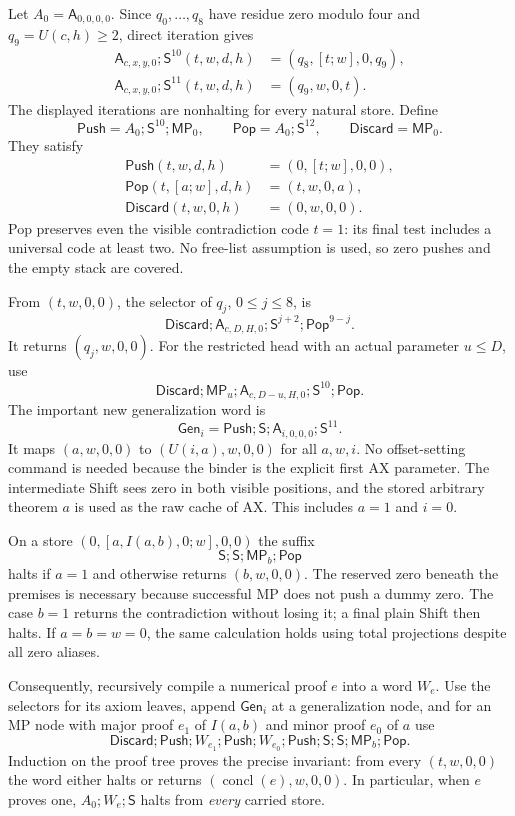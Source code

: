 Let $A_0=\mathsf A_{0,0,0,0}$. Since $q_0,\ldots,q_8$ have residue
zero modulo four and $q_9=U(c,h)\ge2$, direct iteration gives
\begin{align*}
 \mathsf A_{c,x,y,0};\mathsf S^{10}(t,w,d,h)
      &=(q_8,[t;w],0,q_9),\\
 \mathsf A_{c,x,y,0};\mathsf S^{11}(t,w,d,h)
      &=(q_9,w,0,t).
\end{align*}
The displayed iterations are nonhalting for every natural store.
Define
\[
 \mathsf{Push}=A_0;\mathsf S^{10};\mathsf{MP}_0,\qquad
 \mathsf{Pop}=A_0;\mathsf S^{12},\qquad
 \mathsf{Discard}=\mathsf{MP}_0.
\]
They satisfy
\begin{align*}
 \mathsf{Push}(t,w,d,h)&=(0,[t;w],0,0),\\
 \mathsf{Pop}(t,[a;w],d,h)&=(t,w,0,a),\\
 \mathsf{Discard}(t,w,0,h)&=(0,w,0,0).
\end{align*}
Pop preserves even the visible contradiction code $t=1$: its final
test includes a universal code at least two. No free-list assumption is
used, so zero pushes and the empty stack are covered.

From $(t,w,0,0)$, the selector of $q_j$, $0\le j\le8$, is
\[
 \mathsf{Discard};\mathsf A_{c,D,H,0};
           \mathsf S^{j+2};\mathsf{Pop}^{9-j}.
\]
It returns $(q_j,w,0,0)$. For the restricted head with an actual
parameter $u\le D$, use
\[
 \mathsf{Discard};\mathsf{MP}_u;
 \mathsf A_{c,D-u,H,0};\mathsf S^{10};\mathsf{Pop}.
\]
The important new generalization word is
\[
 \boxed{\mathsf{Gen}_i=
       \mathsf{Push};\mathsf S;\mathsf A_{i,0,0,0};\mathsf S^{11}.}
\]
It maps $(a,w,0,0)$ to $(U(i,a),w,0,0)$ for all $a,w,i$.
No offset-setting command is needed because the binder is the explicit
first AX parameter. The intermediate Shift sees zero in both visible
positions, and the stored arbitrary theorem $a$ is used as the raw cache
of AX. This includes $a=1$ and $i=0$.

On a store $(0,[a,I(a,b),0;w],0,0)$ the suffix
\[
       \mathsf S;\mathsf S;\mathsf{MP}_b;\mathsf{Pop}
\]
halts if $a=1$ and otherwise returns $(b,w,0,0)$.
The reserved zero beneath the premises is necessary because successful
MP does not push a dummy zero. The case $b=1$ returns the contradiction
without losing it; a final plain Shift then halts. If $a=b=w=0$, the
same calculation holds using total projections despite all zero aliases.

Consequently, recursively compile a numerical proof $e$ into a word
$W_e$. Use the selectors for its axiom leaves, append $\mathsf{Gen}_i$
at a generalization node, and for an MP node with major proof $e_1$ of
$I(a,b)$ and minor proof $e_0$ of $a$ use
\[
 \mathsf{Discard};\mathsf{Push};W_{e_1};\mathsf{Push};
 W_{e_0};\mathsf{Push};\mathsf S;\mathsf S;
                       \mathsf{MP}_b;\mathsf{Pop}.
\]
Induction on the proof tree proves the precise invariant: from every
$(t,w,0,0)$ the word either halts or returns
$(\operatorname{concl}(e),w,0,0)$. In particular, when $e$ proves one,
$A_0;W_e;\mathsf S$ halts from \emph{every} carried store.

